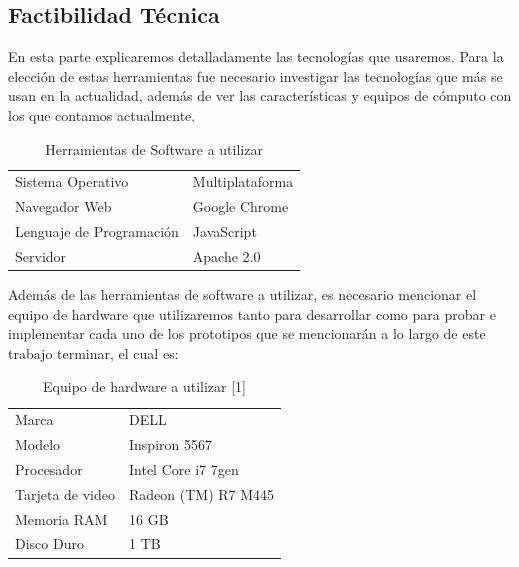 \documentclass[12pt, a4paper, titlepage]{report}
\begin{document}
    	    \subsection{Factibilidad Técnica}
    	    En esta parte explicaremos detalladamente las tecnologías que usaremos. Para la elección de estas herramientas  fue necesario investigar las tecnologías que más se usan en la actualidad, además de ver las características y equipos de c\'omputo con los que contamos actualmente.
    	        \begin{table}[H]
    				\begin{tabular}{ |p{3.5cm}||p{9.5cm}|}
    					\hline
    					\rowcolor{guindapoli}
    					\multicolumn{2}{|c|}{\textbf{\textcolor{white}{Factibilidad T\'ecnica}}}\\
    					\hline
    					\cellcolor{azulclaro}Sistema Operativo & 
    					Multiplataforma \\ 
    					\hline
    					\cellcolor{azulclaro}Navegador Web &
    					Google Chrome\\
    					\hline
    					\cellcolor{azulclaro}Lenguaje de Programaci\'on &
    					JavaScript\\
    					\hline
    					\cellcolor{azulclaro}Servidor &
    					Apache 2.0\\
    					\hline
    					
    				\end{tabular}
    				\caption[Herramientas de Software]{Herramientas de Software a utilizar}
    				\end{table}
    				Además de las herramientas de software a utilizar, es necesario mencionar el equipo de hardware que utilizaremos tanto para desarrollar como para probar e implementar cada uno de los prototipos que se mencionarán a lo largo de este trabajo terminar, el cual es:
    				\begin{table}[H]
        				\begin{tabular}{ |p{3.5cm}||p{9.5cm}|}
        					\hline
        					\rowcolor{guindapoli}
        					\multicolumn{2}{|c|}{\textbf{\textcolor{white}{Equipo de hardware [1]}}}\\
        					\hline
        					\rowcolor{azulfuerte}Marca & DELL\\
        					\hline
        					\cellcolor{azulclaro}Modelo & Inspiron 5567\\ 
        					\hline
        					\cellcolor{azulclaro}Procesador &
        					Intel Core i7 7gen\\
        					\hline
        					\cellcolor{azulclaro}Tarjeta de video & 
        					Radeon (TM) R7 M445\\
        					\hline
        					\cellcolor{azulclaro}Memoria RAM &
        					16 GB\\
        					\hline
        					\cellcolor{azulclaro}Disco Duro &
        					1 TB\\
        					\hline
        				\end{tabular}
    				\caption[Equipo de Hardware 1]{Equipo de hardware a utilizar [1]}
    				\end{table}
\end{document}
